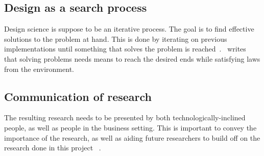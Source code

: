 \documentclass[../Main/thesis.tex]{subfiles}
\begin{document}
\subsection*{Design as a search process}%
\label{sub:design_as_a_search_process}
Design science is suppose to be an iterative process. The goal is to find
effective solutions to the problem at hand. This is done by iterating on
previous implementations until something that solves the problem is
reached~\cite{Hevner:2004:DSI:2017212.2017217}.~\citeauthor{Hevner:2004:DSI:2017212.2017217}
writes that solving problems needs means to reach the desired ends while
satisfying laws from the environment.

\subsection*{Communication of research}%
\label{sub:communication_of_research}
The resulting research needs to be presented by both technologically-inclined
people, as well as people in the business setting. This is important to convey
the importance of the research, as well as aiding future researchers to build
off on the research done in this project ~\cite{Hevner:2004:DSI:2017212.2017217}.


\blankpage
\end{document}
